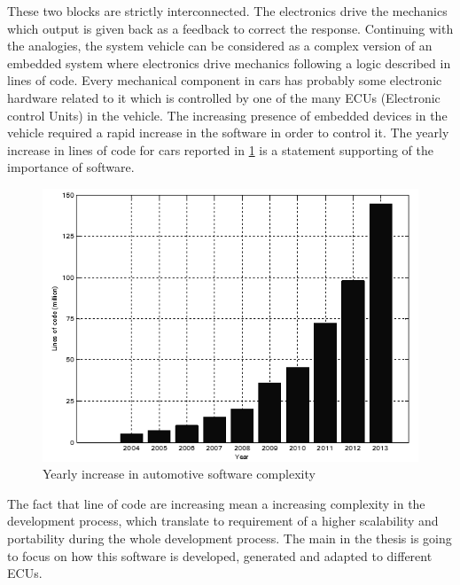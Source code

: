 \documentclass[../main.tex]{subfiles}
\begin{document}
These two blocks are strictly interconnected. The electronics drive the mechanics which output is given back as a feedback to correct the response. Continuing with the analogies, the system vehicle can be considered as a complex version of an embedded system where electronics drive mechanics following a logic described in lines of code.
Every mechanical component in cars has probably some electronic hardware related to it which is controlled by one of the many ECUs (Electronic control Units) in the vehicle. The increasing presence of embedded devices in the vehicle required a rapid increase in the software in order to control it. The yearly increase in lines of code for cars reported in \ref{fig:yearlyincreas} is a statement supporting of the importance of software. 
\begin{figure}[H]
    \centering
    \includegraphics[width=0.6\linewidth]{images_folder/Yearly-increase-in-automotive-software-complexity-shown-by-million-lines-of-code-of-1-ConvertImage.png}
    \caption{Yearly increase in automotive software complexity}
    \label{fig:yearlyincreas}
\end{figure}
The fact that line of code are increasing mean a increasing complexity in the development process, which translate to requirement of a higher scalability and portability during the whole development process. The main in the thesis is going to focus on how this software is developed, generated and adapted to different ECUs. 
\end{document}
